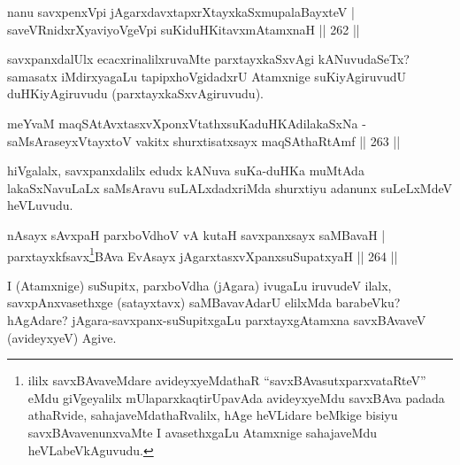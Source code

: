 
\begin{shl}
nanu savxpenxV\s pi jAgarxdavxtapxrXtayxkaSxmupalaBayxteV |\\
saveVRnidxrXyaviyoVgeV\s pi suKiduHKitavxmAtamxnaH \hfill || 262 ||
\end{shl}

\begin{artha}
savxpanxdalUlx ecacxrinalilxruvaMte parxtayxkaSxvAgi kANuvudaSeTx? samasatx iMdirxyagaLu tapipxhoVgidadxrU Atamxnige suKiyAgiruvudU duHKiyAgiruvudu (parxtayxkaSx\-vAgiruvudu).
\end{artha}


\begin{shl}
meYvaM maqSAtAvxtasxvXponxVtathxsuKaduHKAdilakaSxNa -\\
saMsAraseyxVtayxtoV vakitx shurxtisatxsayx maqSAthaRtAmf \hfill || 263 ||
\end{shl}

\begin{artha}
hiVgalalx, savxpanxdalilx edudx kANuva suKa-duHKa muMtAda lakaSxNavuLaLx saMsAravu suLALxdadxriMda shurxtiyu adanunx suLeLxMdeV heVLuvudu.
\end{artha}


\begin{shl}
nAsayx sAvxpaH parxboVdhoV vA kutaH savxpanxsayx saMBavaH |\\
parxtayxkfsavx\footnote{ililx savxBAvaveMdare avideyxyeMdathaR ``savxBAvasutxparxvataRteV'' eMdu giVgeyalilx mUlaparxkaqtirUpavAda avideyxyeMdu savxBAva padada athaRvide, sahajaveMdathaRvalilx, hAge heVLidare beMkige bisiyu savxBAvavenunxvaMte I avasethxgaLu Atamxnige sahajaveMdu heVLabeVkAguvudu.}BAva EvAsayx jAgarxtasxvXpanxsuSupatxyaH \hfill || 264 ||
\end{shl}

\begin{artha}
I (Atamxnige) suSupitx, parxboVdha (jAgara) ivugaLu iruvudeV ilalx, savxpAnxvasethxge (satayxtavx) saMBavavAdarU elilxMda barabeVku? hAgAdare? jAgara-savxpanx-suSupitxgaLu parxtayxgAtamxna savxBAvaveV (avideyxyeV) Agive.
\end{artha}


